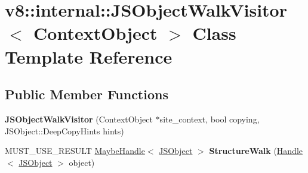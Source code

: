 \hypertarget{classv8_1_1internal_1_1_j_s_object_walk_visitor}{}\section{v8\+:\+:internal\+:\+:J\+S\+Object\+Walk\+Visitor$<$ Context\+Object $>$ Class Template Reference}
\label{classv8_1_1internal_1_1_j_s_object_walk_visitor}
\subsection*{Public Member Functions}
\begin{DoxyCompactItemize}
\item 
{\bfseries J\+S\+Object\+Walk\+Visitor} (Context\+Object $\ast$site\+\_\+context, bool copying, J\+S\+Object\+::\+Deep\+Copy\+Hints hints)\hypertarget{classv8_1_1internal_1_1_j_s_object_walk_visitor_a6f4be6139eeced908e1cc941f370d7a9}{}\label{classv8_1_1internal_1_1_j_s_object_walk_visitor_a6f4be6139eeced908e1cc941f370d7a9}

\item 
M\+U\+S\+T\+\_\+\+U\+S\+E\+\_\+\+R\+E\+S\+U\+LT \hyperlink{classv8_1_1internal_1_1_maybe_handle}{Maybe\+Handle}$<$ \hyperlink{classv8_1_1internal_1_1_j_s_object}{J\+S\+Object} $>$ {\bfseries Structure\+Walk} (\hyperlink{classv8_1_1internal_1_1_handle}{Handle}$<$ \hyperlink{classv8_1_1internal_1_1_j_s_object}{J\+S\+Object} $>$ object)\hypertarget{classv8_1_1internal_1_1_j_s_object_walk_visitor_a2f0d22c56f043331aae7fcb88e175ee6}{}\label{classv8_1_1internal_1_1_j_s_object_walk_visitor_a2f0d22c56f043331aae7fcb88e175ee6}

\end{DoxyCompactItemize}
